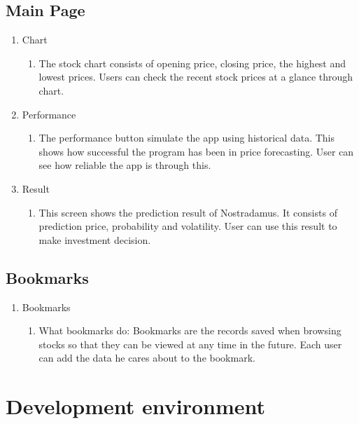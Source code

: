 \documentclass[conference]{IEEEtran}
\begin{document}
\subsection{Main Page }    

\begin{enumerate}
\item Chart
    \begin{enumerate}
    \item The stock chart consists of opening price, closing price, the highest and lowest prices. Users can check the recent stock prices at a glance through chart.
\end{enumerate}
\item Performance
    \begin{enumerate}
    \item The performance button simulate the app using historical data. This shows how successful the program has been in price forecasting. User can see how reliable the app is through this.
    \end{enumerate}
\item Result
    \begin{enumerate}
    \item This screen shows the prediction result of Nostradamus. It consists of prediction price, probability and volatility. User can use this result to make investment decision.
    \end{enumerate}    
\end{enumerate}

\subsection{Bookmarks}    

\begin{enumerate}
\item Bookmarks
    \begin{enumerate}
    \item What bookmarks do: Bookmarks are the records saved when browsing stocks so that they can be viewed at any time in the future. Each user can add the data he cares about to the bookmark.
    \end{enumerate}
 
\end{enumerate}


\section{Development environment}
\end{document}
